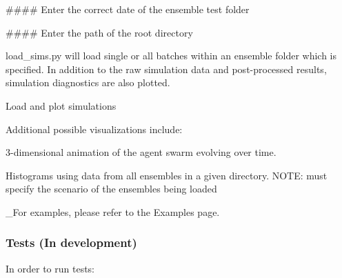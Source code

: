 \#\#\#\# Enter the correct date of the ensemble test folder 
\begin{DoxyCode}{0}
\end{DoxyCode}


\#\#\#\# Enter the path of the root directory 
\begin{DoxyCode}{0}
\DoxyCodeLine{}
\DoxyCodeLine{}
\DoxyCodeLine{\#\#\#\#\#\#\#\#\#\#\#\#\#\#\#\#\#\#\#\#\#\#\#\#\#\#\#\#\#\#\#\#\#\#\#\#\#\#\#\#\#\#\#\#\#\#\#\#\#\#\#\#\#\#\#\#\#\#\#\#\#\#\#\#\#\#\#\#\#\#\#\#\#}
\end{DoxyCode}


load\+\_\+sims.\+py will load single or all batches within an ensemble folder which is specified. In addition to the raw simulation data and post-\/processed results, simulation diagnostics are also plotted.

Load and plot simulations 
\begin{DoxyCode}{0}
\end{DoxyCode}


Additional possible visualizations include\+:
\begin{DoxyItemize}
\item 3-\/dimensional animation of the agent swarm evolving over time.
\item Histograms using data from all ensembles in a given directory. N\+O\+TE\+: must specify the scenario of the ensembles being loaded
\end{DoxyItemize}

\+\_\+\+For examples, please refer to the Examples page.

\subsubsection*{Tests (In development)}

In order to run tests\+:


\begin{DoxyCode}{0}
\end{DoxyCode}


